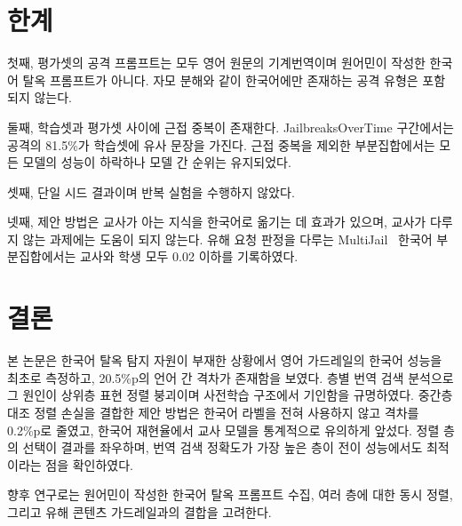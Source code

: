 \documentclass[twocolumn, 10pt]{article}
\begin{document}
\section{한계}

첫째, 평가셋의 공격 프롬프트는 모두 영어 원문의 기계번역이며 원어민이 작성한 한국어 탈옥 프롬프트가 아니다.
자모 분해와 같이 한국어에만 존재하는 공격 유형은 포함되지 않는다.

둘째, 학습셋과 평가셋 사이에 근접 중복이 존재한다.
JailbreaksOverTime 구간에서는 공격의 81.5\%가 학습셋에 유사 문장을 가진다.
근접 중복을 제외한 부분집합에서는 모든 모델의 성능이 하락하나 모델 간 순위는 유지되었다.

셋째, 단일 시드 결과이며 반복 실험을 수행하지 않았다.

넷째, 제안 방법은 교사가 아는 지식을 한국어로 옮기는 데 효과가 있으며, 교사가 다루지 않는 과제에는 도움이 되지 않는다.
유해 요청 판정을 다루는 MultiJail~\cite{deng:iclr2024} 한국어 부분집합에서는 교사와 학생 모두 0.02 이하를 기록하였다.

\section{결론}

본 논문은 한국어 탈옥 탐지 자원이 부재한 상황에서 영어 가드레일의 한국어 성능을 최초로 측정하고, 20.5\%p의 언어 간 격차가 존재함을 보였다.
층별 번역 검색 분석으로 그 원인이 상위층 표현 정렬 붕괴이며 사전학습 구조에서 기인함을 규명하였다.
중간층 대조 정렬 손실을 결합한 제안 방법은 한국어 라벨을 전혀 사용하지 않고 격차를 0.2\%p로 줄였고, 한국어 재현율에서 교사 모델을 통계적으로 유의하게 앞섰다.
정렬 층의 선택이 결과를 좌우하며, 번역 검색 정확도가 가장 높은 층이 전이 성능에서도 최적이라는 점을 확인하였다.

향후 연구로는 원어민이 작성한 한국어 탈옥 프롬프트 수집, 여러 층에 대한 동시 정렬, 그리고 유해 콘텐츠 가드레일과의 결합을 고려한다.



\end{document}
